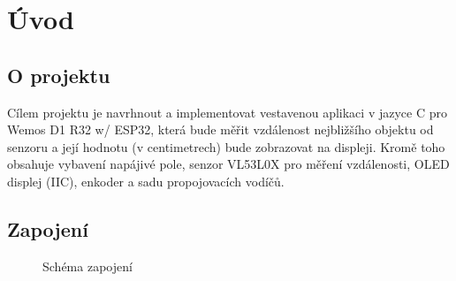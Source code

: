 \graphicspath{{Images/}}

\section{Úvod}
    \subsection{O projektu}

    \begin{spacing}{1.5}
    \fontsize{14}{14}\selectfont
    
    Cílem projektu je navrhnout a implementovat vestavenou aplikaci v jazyce C pro Wemos D1 R32 w/ ESP32, která bude měřit vzdálenost nejbližšího objektu od senzoru a její hodnotu (v centimetrech) bude zobrazovat na displeji. Kromě toho obsahuje vybavení napájivé pole, senzor VL53L0X pro měření vzdálenosti, OLED displej (IIC), enkoder a sadu propojovacích  vodíčů. 
    \end{spacing}

    \subsection{Zapojení}

    \begin{figure}[h]
        \centering
        \caption{Schéma zapojení}
        \label{zapojeni}
    \end{figure}
    
